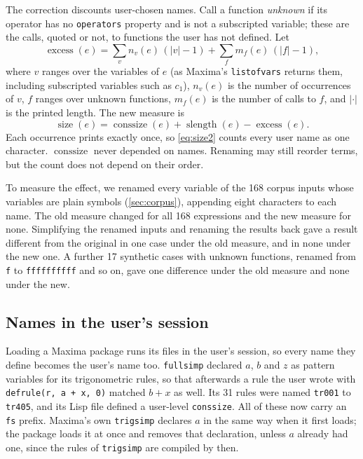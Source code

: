 \documentclass[11pt]{amsart}
\newcommand{\mx}{\lstinline[style=mx]}
\theoremstyle{definition}
\theoremstyle{remark}
\DeclareMathOperator{\size}{size}
\DeclareMathOperator{\conssize}{conssize}
\DeclareMathOperator{\slength}{slength}
\DeclareMathOperator{\excess}{excess}
\begin{document}
The correction discounts user-chosen names. Call a function \emph{unknown}
if its operator has no \mx|operators| property and is not a subscripted
variable; these are the calls, quoted or not, to functions the user has not
defined. Let
\[
  \excess(e) = \sum_{v} n_v(e)\,(|v| - 1) + \sum_{f} m_f(e)\,(|f| - 1),
\]
where $v$ ranges over the variables of $e$ (as Maxima's \mx|listofvars|
returns them, including subscripted variables such as $c_1$), $n_v(e)$ is
the number of occurrences of $v$, $f$ ranges over unknown functions,
$m_f(e)$ is the number of calls to $f$, and $|\cdot|$ is the printed length.
The new measure is
\begin{equation}\label{eq:size2}
  \size(e) = \conssize(e) + \slength(e) - \excess(e).
\end{equation}
Each occurrence prints exactly once, so \eqref{eq:size2} counts every user
name as one character. $\conssize$ never depended on names. Renaming may
still reorder terms, but the count does not depend on their order.

To measure the effect, we renamed every variable of the 168 corpus inputs
whose variables are plain symbols (\cref{sec:corpus}), appending eight characters to
each name. The old measure changed for all 168 expressions and the new
measure for none. Simplifying the renamed inputs and renaming the results
back gave a result different from the original in one case under the old
measure, and in none under the new one. A further 17 synthetic cases with
unknown functions, renamed from \mx|f| to \mx|ffffffffff| and so on, gave one
difference under the old measure and none under the new.

\subsection{Names in the user's session}\label{sec:session}

Loading a Maxima package runs its files in the user's session, so every
name they define becomes the user's name too. \texttt{fullsimp} declared
$a$, $b$ and $z$ as pattern variables for its trigonometric rules, so that
afterwards a rule the user wrote with \mx|defrule(r, a + x, 0)| matched
$b + x$ as well. Its 31 rules were named \mx|tr001| to \mx|tr405|, and its
Lisp file defined a user-level \mx|conssize|. All of these now carry an
\mx|fs| prefix. Maxima's own \mx|trigsimp| declares $a$ in the same way when
it first loads; the package loads it at once and removes that declaration,
unless $a$ already had one, since the rules of \mx|trigsimp| are compiled by
then.
\end{document}
